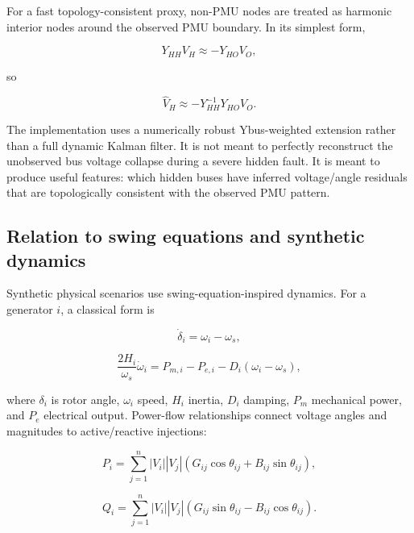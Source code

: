 \documentclass[11pt]{article}
\begin{document}
For a fast topology-consistent proxy, non-PMU nodes are treated as harmonic
interior nodes around the observed PMU boundary. In its simplest form,

\begin{equation}
  Y_{HH} V_H \approx -Y_{HO} V_O,
  \label{eq:harmonic}
\end{equation}

so

\begin{equation}
  \hat V_H \approx -Y_{HH}^{-1}Y_{HO}V_O.
\end{equation}

The implementation uses a numerically robust Ybus-weighted extension rather than
a full dynamic Kalman filter. It is not meant to perfectly reconstruct the
unobserved bus voltage collapse during a severe hidden fault. It is meant to
produce useful features: which hidden buses have inferred voltage/angle
residuals that are topologically consistent with the observed PMU pattern.

\subsection{Relation to swing equations and synthetic dynamics}

Synthetic physical scenarios use swing-equation-inspired dynamics. For a
generator $i$, a classical form is

\begin{equation}
  \dot{\delta}_i = \omega_i-\omega_s,
\end{equation}

\begin{equation}
  \frac{2H_i}{\omega_s}\dot{\omega}_i =
  P_{m,i} - P_{e,i} - D_i(\omega_i-\omega_s),
  \label{eq:swing}
\end{equation}

where $\delta_i$ is rotor angle, $\omega_i$ speed, $H_i$ inertia, $D_i$ damping,
$P_m$ mechanical power, and $P_e$ electrical output. Power-flow relationships
connect voltage angles and magnitudes to active/reactive injections:

\begin{equation}
  P_i =
  \sum_{j=1}^{n}
  |V_i||V_j|
  \left(G_{ij}\cos\theta_{ij}+B_{ij}\sin\theta_{ij}\right),
\end{equation}

\begin{equation}
  Q_i =
  \sum_{j=1}^{n}
  |V_i||V_j|
  \left(G_{ij}\sin\theta_{ij}-B_{ij}\cos\theta_{ij}\right).
\end{equation}
\end{document}
